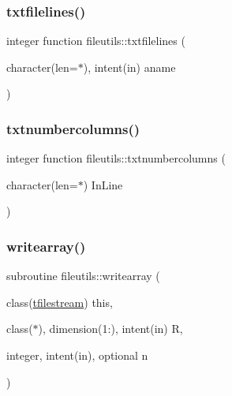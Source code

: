 \mbox{\label{namespacefileutils_a2b9938e7b58f8d85091546603d9e8f08}} 
\subsubsection{\texorpdfstring{txtfilelines()}{txtfilelines()}}
{\footnotesize\ttfamily integer function fileutils\+::txtfilelines (\begin{DoxyParamCaption}\item[{character(len=$\ast$), intent(in)}]{aname }\end{DoxyParamCaption})\hspace{0.3cm}{\ttfamily [private]}}

\mbox{\label{namespacefileutils_a16fc3d0615e1fa05eed9d70c7f6c8861}} 
\subsubsection{\texorpdfstring{txtnumbercolumns()}{txtnumbercolumns()}}
{\footnotesize\ttfamily integer function fileutils\+::txtnumbercolumns (\begin{DoxyParamCaption}\item[{character(len=$\ast$)}]{In\+Line }\end{DoxyParamCaption})\hspace{0.3cm}{\ttfamily [private]}}

\mbox{\label{namespacefileutils_af7dad8ef48af586cc127b552cadeb999}} 
\subsubsection{\texorpdfstring{writearray()}{writearray()}}
{\footnotesize\ttfamily subroutine fileutils\+::writearray (\begin{DoxyParamCaption}\item[{class(\mbox{\hyperlink{structfileutils_1_1tfilestream}{tfilestream}})}]{this,  }\item[{class($\ast$), dimension(1\+:), intent(in)}]{R,  }\item[{integer, intent(in), optional}]{n }\end{DoxyParamCaption})\hspace{0.3cm}{\ttfamily [private]}}



